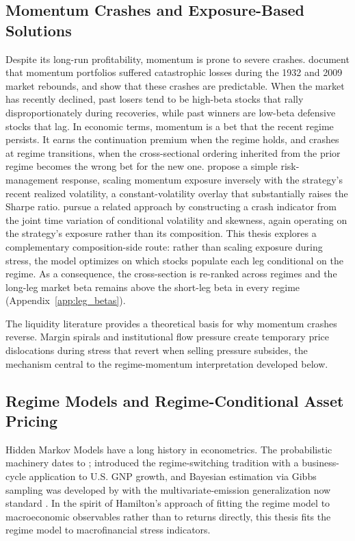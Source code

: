 \subsection{Momentum Crashes and Exposure-Based Solutions}\label{sec:lit_crashes}

Despite its long-run profitability, momentum is prone to severe crashes. \citet{DanielMoskowitz2016} document that momentum portfolios suffered catastrophic losses during the 1932 and 2009 market rebounds, and show that these crashes are predictable. When the market has recently declined, past losers tend to be high-beta stocks that rally disproportionately during recoveries, while past winners are low-beta defensive stocks that lag. In economic terms, momentum is a bet that the recent regime persists. It earns the continuation premium when the regime holds, and crashes at regime transitions, when the cross-sectional ordering inherited from the prior regime becomes the wrong bet for the new one. \citet{BarrosoSantaClara2015} propose a simple risk-management response, scaling momentum exposure inversely with the strategy's recent realized volatility, a constant-volatility overlay that substantially raises the Sharpe ratio. \citet{BianchiDePolisPetrella2022} pursue a related approach by constructing a crash indicator from the joint time variation of conditional volatility and skewness, again operating on the strategy's exposure rather than its composition. This thesis explores a complementary composition-side route: rather than scaling exposure during stress, the model optimizes on which stocks populate each leg conditional on the regime. As a consequence, the cross-section is re-ranked across regimes and the long-leg market beta remains above the short-leg beta in every regime (Appendix~\ref{app:leg_betas}).

The liquidity literature provides a theoretical basis for why momentum crashes reverse. Margin spirals \citep{BrunnermeierPedersen2009} and institutional flow pressure \citep{VayanosWoolley2013} create temporary price dislocations during stress that revert when selling pressure subsides, the mechanism central to the regime-momentum interpretation developed below.

\subsection{Regime Models and Regime-Conditional Asset Pricing}\label{sec:lit_hmm}

Hidden Markov Models have a long history in econometrics. The probabilistic machinery dates to \citet{Baum1970}; \citet{Hamilton1989} introduced the regime-switching tradition with a business-cycle application to U.S. GNP growth, and Bayesian estimation via Gibbs sampling was developed by \citet{AlbertChib1993} with the multivariate-emission generalization now standard \citep{FruhwirthSchnatter2006}. In the spirit of Hamilton's approach of fitting the regime model to macroeconomic observables rather than to returns directly, this thesis fits the regime model to macrofinancial stress indicators.

